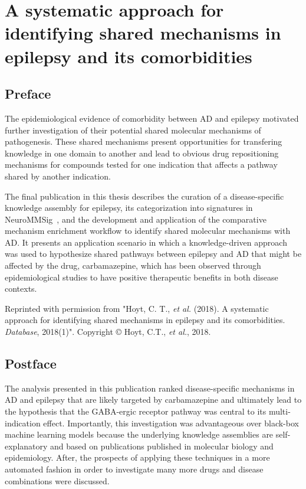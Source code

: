 \chapter{A systematic approach for identifying shared mechanisms in epilepsy and its comorbidities}
\label{ch:epicom}

\section*{Preface}

The epidemiological evidence of comorbidity between \ac{AD} and epilepsy motivated further investigation of their potential shared molecular mechanisms of pathogenesis.
These shared mechanisms present opportunities for transfering knowledge in one domain to another and lead to obvious drug repositioning mechanisms for compounds tested for one indication that affects a pathway shared by another indication.

The final publication in this thesis describes the curation of a disease-specific knowledge assembly for epilepsy, its categorization into signatures in NeuroMMSig~\cite{Domingo-Fernandez2017}, and the development and application of the comparative mechanism enrichment workflow to identify shared molecular mechanisms with \ac{AD}.
It presents an application scenario in which a knowledge-driven approach was used to hypothesize shared pathways between epilepsy and \ac{AD} that might be affected by the drug, carbamazepine, which has been observed through epidemiological studies to have positive therapeutic benefits in both disease contexts.

\vspace*{\fill}

Reprinted with permission from "Hoyt, C. T., \textit{et al.} (2018). A systematic approach for identifying shared mechanisms in epilepsy and its comorbidities. \textit{Database}, 2018(1)".
Copyright © Hoyt, C.T., \textit{et al.}, 2018.



\section*{Postface}

The analysis presented in this publication ranked disease-specific mechanisms in \ac{AD} and epilepsy that are likely targeted by carbamazepine and ultimately lead to the hypothesis that the GABA-ergic receptor pathway was central to its multi-indication effect.
Importantly, this investigation was advantageous over black-box machine learning models because the underlying knowledge assemblies are self-explanatory and based on publications published in molecular biology and epidemiology.
After, the prospects of applying these techniques in a more automated fashion in order to investigate many more drugs and disease combinations were discussed.


